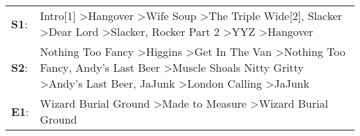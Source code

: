 \begin{supertabular}{p{0.03\textwidth}p{0.92\textwidth}}
 \textbf{S1}:  &                                                   Intro[1]\textsuperscript{} \textgreater \enspace Hangover\textsuperscript{} \textgreater \enspace Wife Soup\textsuperscript{} \textgreater \enspace The Triple Wide[2]\textsuperscript{}, \enspace Slacker\textsuperscript{} \textgreater \enspace Dear Lord\textsuperscript{} \textgreater \enspace Slacker\textsuperscript{}, \enspace Rocker Part 2\textsuperscript{} \textgreater \enspace YYZ\textsuperscript{} \textgreater \enspace Hangover\textsuperscript{}  \enspace  \\
 \textbf{S2}:  &  Nothing Too Fancy\textsuperscript{} \textgreater \enspace Higgins\textsuperscript{} \textgreater \enspace Get In The Van\textsuperscript{} \textgreater \enspace Nothing Too Fancy\textsuperscript{}, \enspace Andy's Last Beer\textsuperscript{} \textgreater \enspace Muscle Shoals Nitty Gritty\textsuperscript{} \textgreater \enspace Andy's Last Beer\textsuperscript{}, \enspace JaJunk\textsuperscript{} \textgreater \enspace London Calling\textsuperscript{} \textgreater \enspace JaJunk\textsuperscript{}  \enspace  \\
 \textbf{E1}:  &                                                                                                                                                                                                                                                                                                                                                             Wizard Burial Ground\textsuperscript{} \textgreater \enspace Made to Measure\textsuperscript{} \textgreater \enspace Wizard Burial Ground\textsuperscript{}  \enspace  \\
\end{supertabular}
